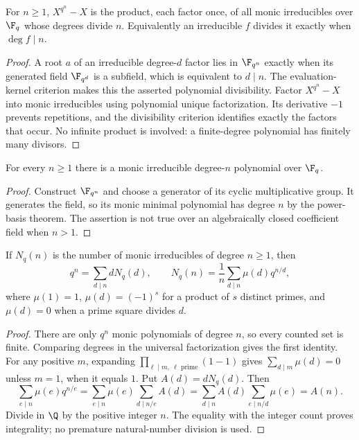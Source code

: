 \begin{theorem}
For $n\geq1$, $X^{q^n}-X$ is the product, each factor once, of all monic irreducibles over $\F_q$ whose degrees divide $n$. Equivalently an irreducible $f$ divides it exactly when $\deg f\mid n$.
\end{theorem}
\begin{proof}
A root $a$ of an irreducible degree-$d$ factor lies in $\F_{q^n}$ exactly when its generated field $\F_{q^d}$ is a subfield, which is equivalent to $d\mid n$. The evaluation-kernel criterion makes this the asserted polynomial divisibility. Factor $X^{q^n}-X$ into monic irreducibles using polynomial unique factorization. Its derivative $-1$ prevents repetitions, and the divisibility criterion identifies exactly the factors that occur. No infinite product is involved: a finite-degree polynomial has finitely many divisors.
\end{proof}

\begin{corollary}
For every $n\geq1$ there is a monic irreducible degree-$n$ polynomial over $\F_q$.
\end{corollary}
\begin{proof}
Construct $\F_{q^n}$ and choose a generator of its cyclic multiplicative group. It generates the field, so its monic minimal polynomial has degree $n$ by the power-basis theorem. The assertion is not true over an algebraically closed coefficient field when $n>1$.
\end{proof}

\begin{theorem}
If $N_q(n)$ is the number of monic irreducibles of degree $n\geq1$, then
\[q^n=\sum_{d\mid n}dN_q(d),\qquad
N_q(n)=\frac1n\sum_{d\mid n}\mu(d)q^{n/d},\]
where $\mu(1)=1$, $\mu(d)=(-1)^s$ for a product of $s$ distinct primes, and $\mu(d)=0$ when a prime square divides $d$.
\end{theorem}
\begin{proof}
There are only $q^n$ monic polynomials of degree $n$, so every counted set is finite. Comparing degrees in the universal factorization gives the first identity. For any positive $m$, expanding $\prod_{\ell\mid m,\ \ell\text{ prime}}(1-1)$ gives $\sum_{d\mid m}\mu(d)=0$ unless $m=1$, when it equals $1$. Put $A(d)=dN_q(d)$. Then
\[\sum_{e\mid n}\mu(e)q^{n/e}
 =\sum_{e\mid n}\mu(e)\sum_{d\mid n/e}A(d)
 =\sum_{d\mid n}A(d)\sum_{e\mid n/d}\mu(e)=A(n).
\]
Divide in $\Q$ by the positive integer $n$. The equality with the integer count proves integrality; no premature natural-number division is used.
\end{proof}

